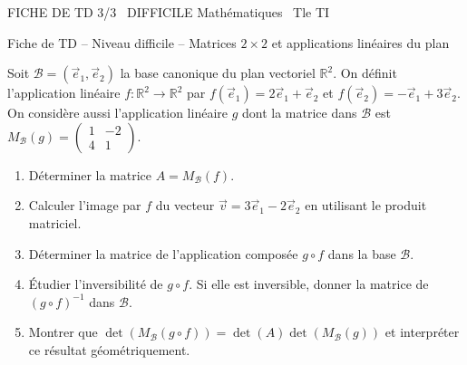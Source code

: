 \documentclass[11pt]{article}
\begin{document}
\begin{tcolorbox}[enhanced,colback=popink,colframe=popink,arc=10pt,boxrule=0pt,left=12pt,right=12pt,top=9pt,bottom=9pt]
{\color{white}\popxbold\small FICHE DE TD 3/3 \textbullet\ DIFFICILE \hfill Mathématiques \textbullet\ Tle TI\par}
\end{tcolorbox}
\vspace{4pt}

\noindent Fiche de TD – Niveau difficile – Matrices $2\times2$ et applications linéaires du plan

\begin{exercice}
Soit $\mathcal{B}=( \vec{e}_1,\vec{e}_2 )$ la base canonique du plan vectoriel $\mathbb{R}^2$.
On définit l'application linéaire $f:\mathbb{R}^2\to\mathbb{R}^2$ par 
$f(\vec{e}_1)=2\vec{e}_1+\vec{e}_2$ et $f(\vec{e}_2)=-\vec{e}_1+3\vec{e}_2$.
On considère aussi l'application linéaire $g$ dont la matrice dans $\mathcal{B}$ est 
$M_{\mathcal{B}}(g)=\begin{pmatrix} 1 & -2 \\ 4 & 1 \end{pmatrix}$.
\begin{enumerate}
\item Déterminer la matrice $A=M_{\mathcal{B}}(f)$.
\item Calculer l'image par $f$ du vecteur $\vec{v}=3\vec{e}_1-2\vec{e}_2$ en utilisant le produit matriciel.
\item Déterminer la matrice de l'application composée $g\circ f$ dans la base $\mathcal{B}$.
\item Étudier l'inversibilité de $g\circ f$. Si elle est inversible, donner la matrice de $(g\circ f)^{-1}$ dans $\mathcal{B}$.
\item Montrer que $\det(M_{\mathcal{B}}(g\circ f))=\det(A)\det(M_{\mathcal{B}}(g))$ et interpréter ce résultat géométriquement.
\end{enumerate}
\end{exercice}
\end{document}
